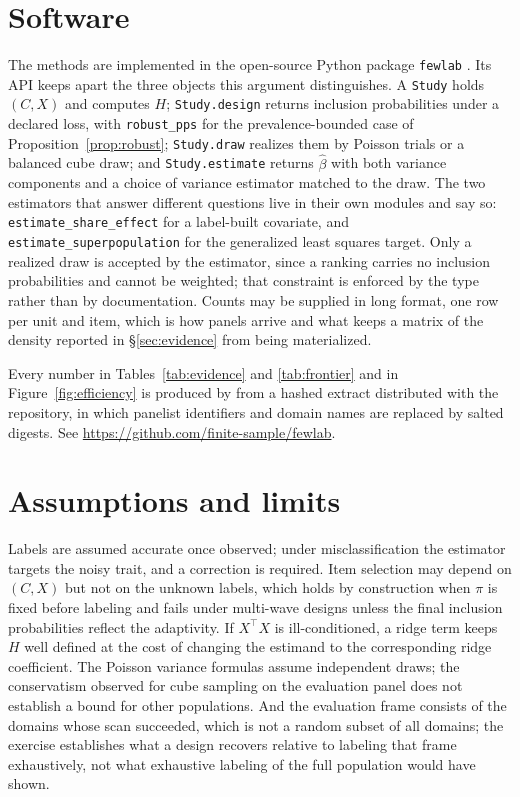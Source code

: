 \documentclass[11pt]{article}
\theoremstyle{plain}
\theoremstyle{remark}
\begin{document}
\section*{Software}

The methods are implemented in the open-source Python package \texttt{fewlab} \citep{fewlab}. Its API keeps apart the three objects this argument distinguishes. A \texttt{Study} holds $(C,X)$ and computes $H$; \texttt{Study.design} returns inclusion probabilities under a declared loss, with \texttt{robust\_pps} for the prevalence-bounded case of Proposition~\ref{prop:robust}; \texttt{Study.draw} realizes them by Poisson trials or a balanced cube draw; and \texttt{Study.estimate} returns $\widehat\beta$ with both variance components and a choice of variance estimator matched to the draw. The two estimators that answer different questions live in their own modules and say so: \texttt{estimate\_share\_effect} for a label-built covariate, and \texttt{estimate\_superpopulation} for the generalized least squares target. Only a realized draw is accepted by the estimator, since a ranking carries no inclusion probabilities and cannot be weighted; that constraint is enforced by the type rather than by documentation. Counts may be supplied in long format, one row per unit and item, which is how panels arrive and what keeps a matrix of the density reported in \S\ref{sec:evidence} from being materialized.

Every number in Tables~\ref{tab:evidence} and \ref{tab:frontier} and in Figure~\ref{fig:efficiency} is produced by  from a hashed extract distributed with the repository, in which panelist identifiers and domain names are replaced by salted digests. See \url{https://github.com/finite-sample/fewlab}.

\section*{Assumptions and limits}

Labels are assumed accurate once observed; under misclassification the estimator targets the noisy trait, and a correction is required. Item selection may depend on $(C,X)$ but not on the unknown labels, which holds by construction when $\pi$ is fixed before labeling and fails under multi-wave designs unless the final inclusion probabilities reflect the adaptivity. If $X^\top X$ is ill-conditioned, a ridge term keeps $H$ well defined at the cost of changing the estimand to the corresponding ridge coefficient. The Poisson variance formulas assume independent draws; the conservatism observed for cube sampling on the evaluation panel does not establish a bound for other populations. And the evaluation frame consists of the domains whose scan succeeded, which is not a random subset of all domains; the exercise establishes what a design recovers relative to labeling that frame exhaustively, not what exhaustive labeling of the full population would have shown.



\end{document}

